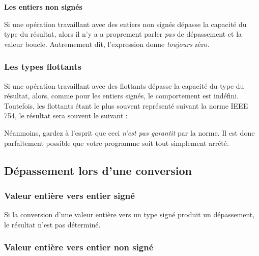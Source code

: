 \textbf{Les entiers non signés}
\label{les-entiers-non-signes}

Si une opération travaillant avec des entiers non signés dépasse la
capacité du type du résultat, alors il n'y a a proprement parler
\emph{pas} de dépassement et la valeur boucle. Autremement dit,
l'expression  donne \emph{toujours} zéro.

\subsubsection{Les types flottants}
\label{les-types-flottants}

Si une opération travaillant avec des flottants dépasse la capacité du
type du résultat, alors, comme pour les entiers signés, le comportement
est indéfini. Toutefois, les flottants étant le plus souvent représenté
suivant la norme IEEE 754, le résultat sera souvent le suivant :


Néanmoins, gardez à l'esprit que ceci \emph{n'est pas garantit} par la
norme. Il est donc parfaitement possible que votre programme soit tout
simplement arrêté.

\subsection{Dépassement lors d'une conversion}
\label{depassement-lors-dune-conversion}

\subsubsection{Valeur entière vers entier signé}
\label{valeur-entiere-vers-entier-signe}

Si la conversion d'une valeur entière vers un type signé produit un
dépassement, le résultat n'est pas déterminé.

\subsubsection{Valeur entière vers entier non signé}
\label{valeur-entiere-vers-entier-non-signe}

